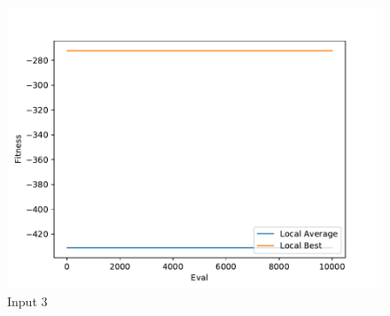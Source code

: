 \documentclass{standalone}
\begin{document}
\begin{figure}[!htb]
	\caption{Input 3}
	\label{fig:graph_3017}
	\includegraphics[width=\textwidth]{../graphs/graphs/3017.pdf}
\end{figure}
\end{document}
